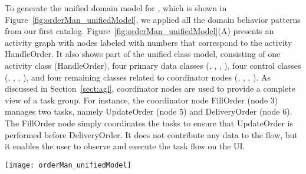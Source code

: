 To generate the unified domain model for \orderman, which is shown in Figure~\ref{fig:orderMan_unifiedModel}, we applied all the domain behavior patterns from our first catalog. Figure~\ref{fig:orderMan_unifiedModel}(A) presents an activity graph with nodes labeled with numbers that correspond to the activity HandleOrder. It also shows part of the unified class model, consisting of one activity class (HandleOrder), four primary data classes (, , , ), four control classes (, , , ), and four remaining classes related to coordinator nodes (, , , ). As discussed in Section~\ref{sect:agl}, coordinator nodes are used to provide a complete view of a task group. For instance, the coordinator node FillOrder (node 3) manages two tasks, namely UpdateOrder (node 5) and DeliveryOrder (node 6). The FillOrder node simply coordinates the tasks to ensure that UpdateOrder is performed before DeliveryOrder. It does not contribute any data to the flow, but it enables the user to observe and execute the task flow on the UI.

\begin{figure*}[ht]
	\centering
	\texttt{[image: orderMan\_unifiedModel]}
	\caption{(A: Left) The activity graph whose nodes are labeled with activity and component classes; (B: Top-right) The  objects; (C: Bottom-right)  objects that are referenced by the .} %
	\label{fig:orderMan_unifiedModel}
	\vspace{-0.2cm}
\end{figure*}

